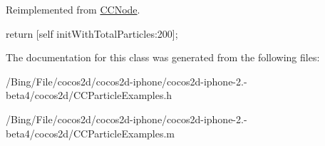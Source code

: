 Reimplemented from \hyperlink{class_c_c_node_ad789cad83aca65c130abd4452d1bc081}{C\-C\-Node}.


\begin{DoxyCode}
{
        return [self initWithTotalParticles:200];
}
\end{DoxyCode}


The documentation for this class was generated from the following files\-:\begin{DoxyCompactItemize}
\item 
/\-Bing/\-File/cocos2d/cocos2d-\/iphone/cocos2d-\/iphone-\/2.-\/beta4/cocos2d/C\-C\-Particle\-Examples.\-h\item 
/\-Bing/\-File/cocos2d/cocos2d-\/iphone/cocos2d-\/iphone-\/2.-\/beta4/cocos2d/C\-C\-Particle\-Examples.\-m\end{DoxyCompactItemize}
